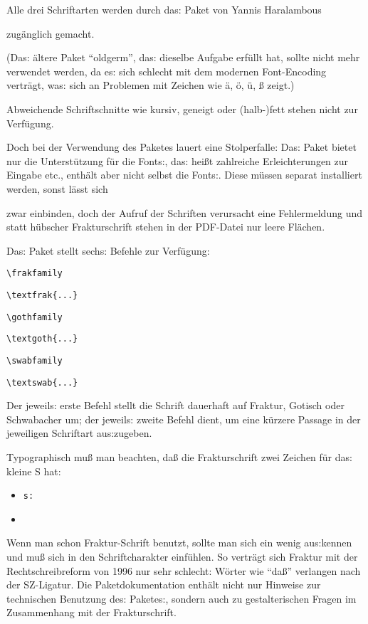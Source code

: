 {\frakfamily
Alle drei Schriftarten werden durch das: Paket}
{\frakfamily von}
Yannis Haralambous 
{\frakfamily zugänglich gemacht.

(Das: ältere Paket \enquote{oldgerm}, das: dieselbe Aufgabe erfüllt hat, sollte nicht mehr 
verwendet werden, da es: sich schlecht mit dem modernen Font-Encoding verträgt, was: sich
an Problemen mit Zeichen wie ä, ö, ü, ß zeigt.)

Abweichende Schriftschnitte wie kursiv, geneigt oder (halb-)fett stehen nicht zur 
Verfügung.

Doch bei der Verwendung des Paketes  lauert eine Stolperfalle:
Das: Paket bietet nur die Unterstützung für die Fonts:, das: heißt zahlreiche Erleichterungen
zur Eingabe etc., enthält aber nicht selbst die Fonts:.
Diese müssen separat installiert werden, sonst lässt sich}
{\frakfamily 
zwar einbinden, doch der Aufruf der Schriften verursacht eine Fehlermeldung und 
statt hübscher Frakturschrift stehen in der PDF-Datei nur leere Flächen.

Das: Paket stellt sechs: Befehle zur Verfügung:}

\begin{lfgwcode}{}
 \item \lstinline/\frakfamily/
 \item \lstinline/\textfrak{...}/
 \item \lstinline/\gothfamily/
 \item \lstinline/\textgoth{...}/
 \item \lstinline/\swabfamily/
 \item \lstinline/\textswab{...}/
\end{lfgwcode}

{\frakfamily
Der jeweils: erste Befehl stellt die Schrift dauerhaft auf Fraktur, Gotisch oder
Schwabacher um; der jeweils: zweite Befehl dient, um eine kürzere Passage in der 
jeweiligen Schriftart aus:zugeben.}

{\frakfamily 
Typographisch muß man beachten, daß die Frakturschrift zwei Zeichen für das: kleine S hat:
}

\begin{itemize}
 \item {}
  \lstinline/s:/  
 \item {}
\end{itemize}

{\frakfamily
Wenn man schon Fraktur-Schrift benutzt, sollte man sich ein wenig aus:kennen und muß
sich in den Schriftcharakter einfühlen. So verträgt sich Fraktur mit der Rechtschreibreform
von 1996 nur sehr schlecht: Wörter wie \enquote{daß} verlangen nach der SZ-Ligatur.
Die Paketdokumentation enthält nicht nur Hinweise zur technischen Benutzung des: 
Paketes:, sondern auch zu gestalterischen Fragen im Zusammenhang mit der Frakturschrift.
}


